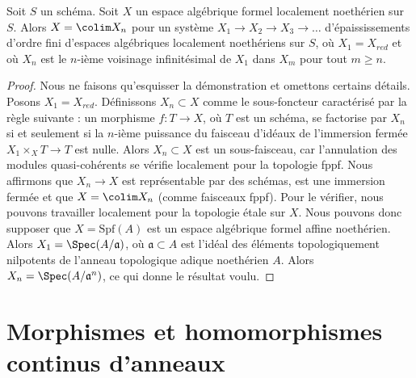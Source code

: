 \begin{lemma}
\label{lemma-structure-locally-noetherian}
Soit $S$ un schéma. Soit $X$ un espace algébrique formel localement noethérien
sur $S$. Alors $X = \colim X_n$ pour un système $X_1 \to X_2 \to X_3 \to \ldots$
d'épaississements d'ordre fini d'espaces algébriques localement noethériens sur $S$,
où $X_1 = X_{red}$ et où $X_n$ est le $n$-ième voisinage infinitésimal de
$X_1$ dans $X_m$ pour tout $m \geq n$.
\end{lemma}

\begin{proof}
Nous ne faisons qu'esquisser la démonstration et omettons certains détails.
Posons $X_1 = X_{red}$. Définissons $X_n \subset X$ comme le sous-foncteur
caractérisé par la règle suivante : un morphisme $f : T \to X$, où $T$ est un schéma, se factorise
par $X_n$ si et seulement si la $n$-ième puissance du faisceau d'idéaux
de l'immersion fermée $X_1 \times_X T \to T$ est nulle. Alors $X_n \subset X$
est un sous-faisceau, car l'annulation des modules quasi-cohérents se vérifie
localement pour la topologie fppf. Nous affirmons que $X_n \to X$ est représentable par des schémas,
est une immersion fermée et que $X = \colim X_n$ (comme faisceaux fppf).
Pour le vérifier, nous pouvons travailler localement pour la topologie étale sur $X$. Nous pouvons donc supposer que
$X = \text{Spf}(A)$ est un espace algébrique formel affine noethérien.
Alors $X_1 = \Spec(A/\mathfrak a)$, où $\mathfrak a \subset A$
est l'idéal des éléments topologiquement nilpotents de l'anneau topologique
adique noethérien $A$. Alors $X_n = \Spec(A/\mathfrak a^n)$,
ce qui donne le résultat voulu.
\end{proof}









\section{Morphismes et homomorphismes continus d'anneaux}
\label{section-morphisms-rings}

